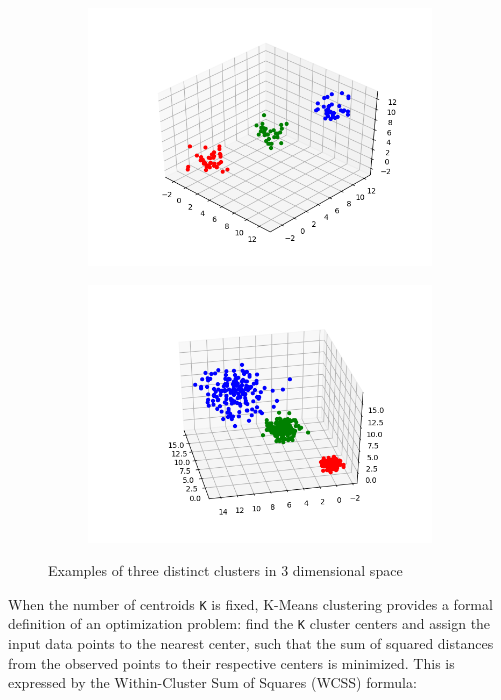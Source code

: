 \documentclass{l4proj}
\begin{document}
\begin{figure}[H]
\label{basic clusters}
\centering
\begin{subfigure}{.5\textwidth}
  \centering
  \includegraphics[width=1.2\linewidth]{images/figure_1}
  \label{fig:sub3}
\end{subfigure}%
\begin{subfigure}{.5\textwidth}
  \centering
  \includegraphics[width=1.2\linewidth]{images/figure_2}
  \label{fig:sub4}
\end{subfigure}
\caption{Examples of three distinct clusters in 3 dimensional space}
\end{figure}

When the number of centroids \texttt{K} is fixed, K-Means clustering provides a formal definition of an optimization problem: find the \texttt{K} cluster centers and assign the input data points to the nearest center, such that the sum of squared distances from the observed points to their respective centers is minimized. This is expressed by the Within-Cluster Sum of Squares (WCSS) formula:
\end{document}
